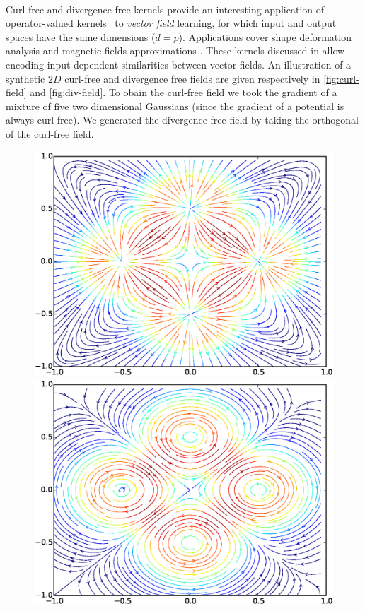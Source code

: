 \documentclass[twoside,11pt]{article}
\begin{document}
\paragraph{}
Curl-free and divergence-free kernels provide an interesting application of
operator-valued kernels~\citep{Macedo2008, Baldassare2012, Micheli2013} to
\emph{vector field} learning, for which input and output spaces have the same
dimensions ($d=p$). Applications cover shape deformation
analysis \citep{Micheli2013} and magnetic fields
approximations \citep{Wahlstrom2013}. These kernels discussed in
\citep{Fuselier2006} allow encoding input-dependent similarities between
vector-fields. An illustration of a synthetic $2D$ curl-free and divergence
free fields are given respectively in \cref{fig:curl-field} and
\cref{fig:div-field}. To obain the curl-free field we took the gradient of
a mixture of five two dimensional Gaussians (since the gradient of a potential
is always curl-free). We generated the divergence-free field by taking the
orthogonal of the curl-free field.
\begin{figure}
    \begin{minipage}{.5\textwidth}
        \centering
        \includegraphics[trim=1.8cm 1cm 2cm 1cm,width=.8\textwidth,clip=true]{./gfx/curl_field.eps}
    \end{minipage}%
    \begin{minipage}{0.5\textwidth}
        \centering
        \includegraphics[trim=1.8cm 1cm 2cm 1cm,width=.8\textwidth,clip=true]{./gfx/div_field.eps}
    \end{minipage}
\end{figure}
\end{document}
